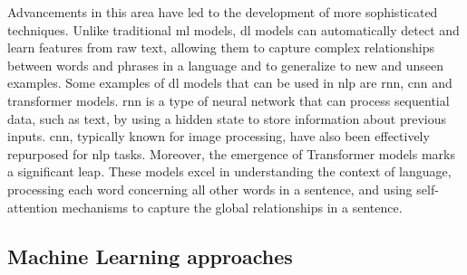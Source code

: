 Advancements in this area have led to the development of more sophisticated techniques. Unlike traditional \ac{ml} models, \ac{dl} models can automatically detect and learn features from raw text, allowing them to capture complex relationships between words and phrases in a language and to generalize to new and unseen examples. Some examples of \ac{dl} models that can be used in \ac{nlp} are \ac{rnn}, \ac{cnn} and transformer models. \ac{rnn} is a type of neural network that can process sequential data, such as text, by using a hidden state to store information about previous inputs. \ac{cnn}, typically known for image processing, have also been effectively repurposed for \ac{nlp} tasks. Moreover, the emergence of Transformer models marks a significant leap. These models excel in understanding the context of language, processing each word concerning all other words in a sentence, and using self-attention mechanisms to capture the global relationships in a sentence.

\begin{comment}
    \citet{Gutierrez2018988} mentioned that the most common defensive approaches frequently display a lack of adaptability. This is primarily because of its basis in rigid frameworks like regular expressions that recognize specific text patterns. This limitation highlights how important it is to find different methods to improve phishing detection. The problem with already existing automated solutions, built to manage the flood of phishing emails, is to quickly detect unseen phishing attempts. A major flaw in these solutions is their reliance on surface-level text analysis rather than exploring deeper linguistic patterns and deceitful strategies, such as the use of synonyms and varied sentence structures.
    In the proposed solution they used advanced \ac{nlp} techniques like Named Entity Recognition that its used to recognize different entity types, such as persons, locations, organizations, within the text, and Freebase that essentialy returns potential categories the entity belongs to and provides a score of how relevant each category is. These two techniques form a set of higher-level features, that also includes synonym substitution, to better understand the semantics of phishing emails.
\end{comment}


\subsection{Machine Learning approaches}


